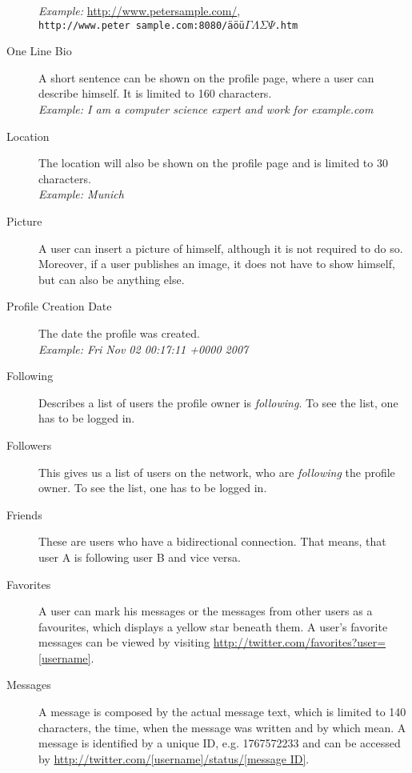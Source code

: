 \begin{description}
                     \textit{Example:} \url{http://www.petersample.com/},\\
                     \texttt{http://www.peter sample.com:8080/äöü$\Gamma\Lambda\Sigma\Psi$.htm}
\item[One Line Bio] A short sentence can be shown on the profile page, where a
                    user can describe himself. It is limited to 160
                    characters.\\
                    \textit{Example: I am a computer science expert and work
                    for example.com}
\item[Location] The location will also be shown on the profile page and is
                limited to 30 characters.\\
                \textit{Example: Munich}
\item[Picture] A user can insert a picture of himself, although it is not
               required to do so. Moreover, if a user publishes an image, it does not have to
               show himself, but can also be anything else.
\item[Profile Creation Date] The date the profile was created.\\
              \textit{Example: Fri Nov 02 00:17:11 +0000 2007}
\item[Following] Describes a list of users the profile owner is \textit{following}.
                 To see the list, one has to be logged in.
\item[Followers] This gives us a list of users on the \Twitter{} network, who
                 are \textit{following} the profile owner. To see the list, one has to be logged in.
\item[Friends] These are users who have a bidirectional connection. That means,
               that user A is following user B and vice versa.
\item[Favorites] A user can mark his messages or the messages from other users as
                 a favourites, which displays a
                 yellow star beneath them. A user's favorite messages can be viewed
                 by visiting \url{http://twitter.com/favorites?user=[username]}.
\item[Messages] A message is composed by the actual message text,
                which is limited to 140 characters, the time, when the message
                was written and by which mean. A message is identified by a unique
                ID, e.g. 1767572233 and can be accessed by
                \url{http://twitter.com/[username]/status/[message ID]}.


\end{description}
